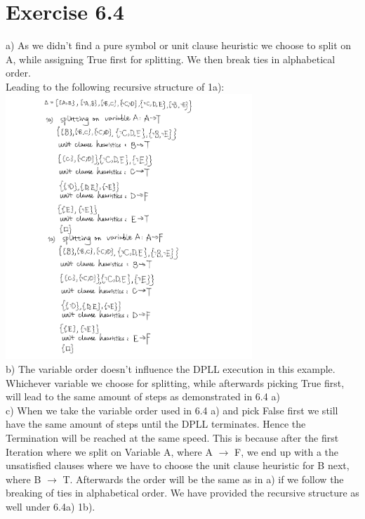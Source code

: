 \documentclass[12pt]{article}
\begin{document}
\section*{Exercise 6.4}
a) As we didn't find a pure symbol or unit clause heuristic we choose to split on A, while assigning True first for splitting. We then break ties in alphabetical order.\\
Leading to the following recursive structure of 1a):\\\includegraphics[height=100mm]{figures/6.4}\\
b) The variable order doesn't influence the DPLL execution in this example. Whichever variable we choose for splitting, while afterwards picking True first, will lead to the same amount of steps as demonstrated in 6.4 a)\\
c) When we take the variable order used in 6.4 a) and pick False first we still have the same amount of steps until the DPLL terminates. Hence the Termination will be reached at the same speed. This is because after the first Iteration where we split on Variable A, where A $\to$ F, we end up with a the unsatisfied clauses where we have to choose the unit clause heuristic for B next, where B $\to$ T. Afterwards the order will be the same as in a) if we follow the breaking of ties in alphabetical order. We have provided the recursive structure as well under 6.4a) 1b).\\
\end{document}
